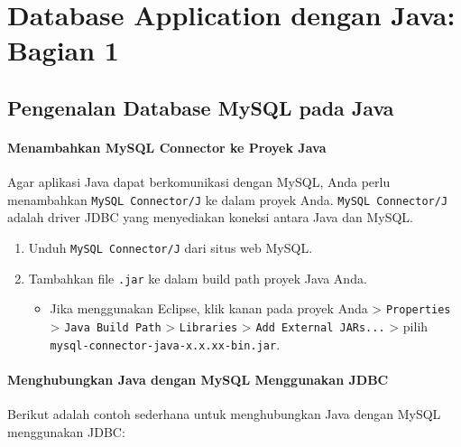 \chapter{Database Application dengan Java: Bagian 1}

\section{Pengenalan Database MySQL pada Java}

\subsubsection{Menambahkan MySQL Connector ke Proyek Java}

Agar aplikasi Java dapat berkomunikasi dengan MySQL, Anda perlu menambahkan \texttt{MySQL Connector/J} ke dalam proyek Anda. \texttt{MySQL Connector/J} adalah driver JDBC yang menyediakan koneksi antara Java dan MySQL.

\begin{enumerate}
	\item Unduh \texttt{MySQL Connector/J} dari situs web MySQL.
	\item Tambahkan file \texttt{.jar} ke dalam build path proyek Java Anda.
	\begin{itemize}
		\item Jika menggunakan Eclipse, klik kanan pada proyek Anda > \texttt{Properties} > \texttt{Java Build Path} > \texttt{Libraries} > \texttt{Add External JARs...} > pilih \texttt{mysql-connector-java-x.x.xx-bin.jar}.
	\end{itemize}
\end{enumerate}

\subsubsection{Menghubungkan Java dengan MySQL Menggunakan JDBC}

Berikut adalah contoh sederhana untuk menghubungkan Java dengan MySQL menggunakan JDBC:

